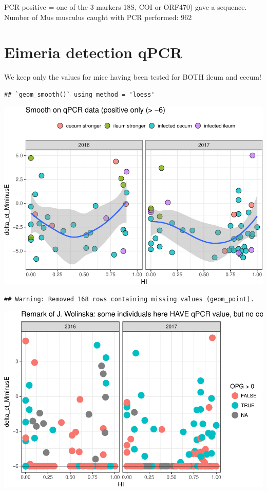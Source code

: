 \documentclass[]{article}
\begin{document}
PCR positive = one of the 3 markers 18S, COI or ORF470) gave a sequence.
Number of Mus musculus caught with PCR performed: 962

\section{Eimeria detection qPCR}\label{eimeria-detection-qpcr}

We keep only the values for mice having been tested for BOTH ileum and
cecum!

\begin{verbatim}
## `geom_smooth()` using method = 'loess'
\end{verbatim}

\includegraphics{Data_Analysis_Alice_files/figure-latex/qpcr-1.pdf}

\begin{verbatim}
## Warning: Removed 168 rows containing missing values (geom_point).
\end{verbatim}

\includegraphics{Data_Analysis_Alice_files/figure-latex/qpcr-2.pdf}
\end{document}
